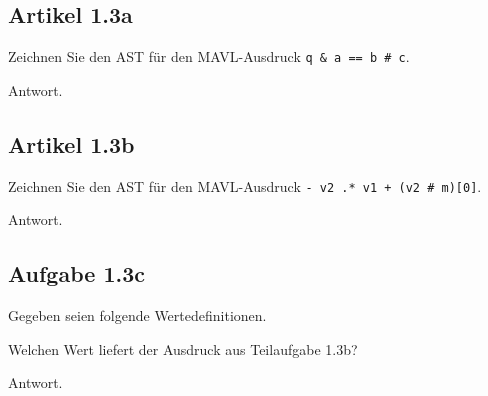 \documentclass[
  ngerman,
  DIV=14
]{scrartcl}
\begin{document}
\subsection*{Artikel 1.3a}
Zeichnen Sie den AST für den MAVL-Ausdruck \texttt{q \& a == b \# c}.


\bigskip\noindent
Antwort.

\subsection*{Artikel 1.3b}
Zeichnen Sie den AST für den MAVL-Ausdruck \texttt{- v2 .* v1 + (v2 \# m)[0]}.


\bigskip\noindent
Antwort.

\subsection*{Aufgabe 1.3c}
Gegeben seien folgende Wertedefinitionen.

Welchen Wert liefert der Ausdruck aus Teilaufgabe 1.3b?

\bigskip\noindent
Antwort.
\end{document}
